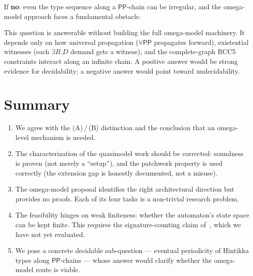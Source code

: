 \documentclass[11pt]{article}
\newcommand{\Pp}{\mathsf{PP}}
\begin{document}
If \textbf{no}: even the type sequence along a $\Pp$-chain can
be irregular, and the omega-model approach faces a fundamental
obstacle.

This question is answerable without building the full omega-model
machinery.  It depends only on how universal propagation
($\forall\Pp$ propagates forward), existential witnesses (each
$\exists R.D$ demand gets a witness), and the complete-graph RCC5
constraints interact along an infinite chain.  A positive answer
would be strong evidence for decidability; a negative answer would
point toward undecidability.

\section{Summary}

\begin{enumerate}
\item We agree with the (A)\,/\,(B) distinction and the conclusion
  that an omega-level mechanism is needed.
\item The characterization of the quasimodel work should be
  corrected: soundness is proven (not merely a ``setup''), and
  the patchwork property is used correctly (the extension gap is
  honestly documented, not a misuse).
\item The omega-model proposal identifies the right architectural
  direction but provides no proofs.  Each of its four tasks is a
  non-trivial research problem.
\item The feasibility hinges on weak finiteness: whether the
  automaton's state space can be kept finite.  This requires the
  signature-counting claim of~\cite{GPT2026Bound}, which we have
  not yet evaluated.
\item We pose a concrete decidable sub-question --- eventual
  periodicity of Hintikka types along $\Pp$-chains --- whose
  answer would clarify whether the omega-model route is viable.
\end{enumerate}
\end{document}
